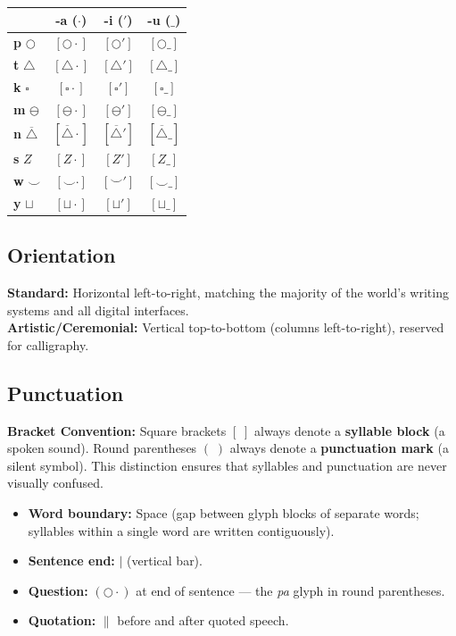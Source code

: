 \documentclass[12pt, a4paper]{article}
\begin{document}
\vspace{0.5em}
\begin{tabular}{@{}l|ccc@{}}
\toprule
 & \textbf{-a} ($\cdot$) & \textbf{-i} ($'$) & \textbf{-u} ($\_$) \\ \midrule
\textbf{p} $\bigcirc$ & $[\bigcirc\cdot]$ & $[\bigcirc']$ & $[\bigcirc\_]$ \\
\textbf{t} $\triangle$ & $[\triangle\cdot]$ & $[\triangle']$ & $[\triangle\_]$ \\
\textbf{k} $\square$ & $[\square\cdot]$ & $[\square']$ & $[\square\_]$ \\
\textbf{m} $\ominus$ & $[\ominus\cdot]$ & $[\ominus']$ & $[\ominus\_]$ \\
\textbf{n} $\overline{\triangle}$ & $[\overline{\triangle}\cdot]$ & $[\overline{\triangle}']$ & $[\overline{\triangle}\_]$ \\
\textbf{s} $Z$ & $[Z\cdot]$ & $[Z']$ & $[Z\_]$ \\
\textbf{w} $\smile$ & $[\smile\cdot]$ & $[\smile']$ & $[\smile\_]$ \\
\textbf{y} $\sqcup$ & $[\sqcup\cdot]$ & $[\sqcup']$ & $[\sqcup\_]$ \\
\bottomrule
\end{tabular}

\subsection{Orientation}
\textbf{Standard:} Horizontal left-to-right, matching the majority of the world's writing systems and all digital interfaces. \\
\textbf{Artistic/Ceremonial:} Vertical top-to-bottom (columns left-to-right), reserved for calligraphy.

\subsection{Punctuation}
\textbf{Bracket Convention:} Square brackets $[\;]$ always denote a \textbf{syllable block} (a spoken sound). Round parentheses $(\;)$ always denote a \textbf{punctuation mark} (a silent symbol). This distinction ensures that syllables and punctuation are never visually confused.

\begin{itemize}
    \item \textbf{Word boundary:} Space (gap between glyph blocks of separate words; syllables within a single word are written contiguously).
    \item \textbf{Sentence end:} $|$ (vertical bar).
    \item \textbf{Question:} $(\bigcirc\cdot)$ at end of sentence --- the \textit{pa} glyph in round parentheses.
    \item \textbf{Quotation:} $\|$ before and after quoted speech.
\end{itemize}
\end{document}
